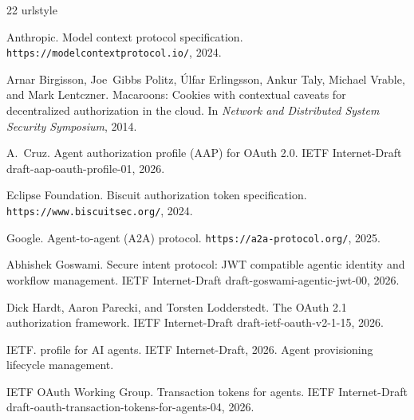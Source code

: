 \documentclass[11pt,a4paper]{article}
\begin{document}
\begin{thebibliography}{22}
\providecommand{\natexlab}[1]{#1}
\providecommand{\url}[1]{\texttt{#1}}
\expandafter\ifx\csname urlstyle\endcsname\relax
  \providecommand{\doi}[1]{doi: #1}\else
  \providecommand{\doi}{doi: \begingroup \urlstyle{rm}\Url}\fi

{Anthropic}.
\newblock Model context protocol specification.
\newblock \url{https://modelcontextprotocol.io/}, 2024.

Arnar Birgisson, Joe~Gibbs Politz, \'Ulfar Erlingsson, Ankur Taly, Michael
  Vrable, and Mark Lentczner.
\newblock Macaroons: Cookies with contextual caveats for decentralized
  authorization in the cloud.
\newblock In \emph{Network and Distributed System Security Symposium}, 2014.

A.~Cruz.
\newblock Agent authorization profile ({AAP}) for {OAuth} 2.0.
\newblock IETF Internet-Draft draft-aap-oauth-profile-01, 2026.

{Eclipse Foundation}.
\newblock Biscuit authorization token specification.
\newblock \url{https://www.biscuitsec.org/}, 2024.

{Google}.
\newblock Agent-to-agent ({A2A}) protocol.
\newblock \url{https://a2a-protocol.org/}, 2025.

Abhishek Goswami.
\newblock Secure intent protocol: {JWT} compatible agentic identity and
  workflow management.
\newblock IETF Internet-Draft draft-goswami-agentic-jwt-00, 2026.

Dick Hardt, Aaron Parecki, and Torsten Lodderstedt.
\newblock The {OAuth} 2.1 authorization framework.
\newblock IETF Internet-Draft draft-ietf-oauth-v2-1-15, 2026.

{IETF}.
 profile for {AI} agents.
\newblock IETF Internet-Draft, 2026.
\newblock Agent provisioning lifecycle management.

{IETF OAuth Working Group}.
\newblock Transaction tokens for agents.
\newblock IETF Internet-Draft draft-oauth-transaction-tokens-for-agents-04,
  2026.


\end{thebibliography}
\end{document}
